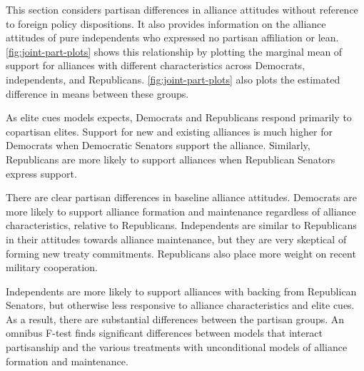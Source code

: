 \documentclass[12pt]{article}
\begin{document}
This section considers partisan differences in alliance attitudes without reference to foreign policy dispositions. 
It also provides information on the alliance attitudes of pure independents who expressed no partisan affiliation or lean. 
\autoref{fig:joint-part-plots} shows this relationship by plotting the marginal mean of support for alliances with different characteristics across Democrats, independents, and Republicans. 
\autoref{fig:joint-part-plots} also plots the estimated difference in means between these groups. 


As elite cues models expects, Democrats and Republicans respond primarily to copartisan elites.
Support for new and existing alliances is much higher for Democrats when Democratic Senators support the alliance.
Similarly, Republicans are more likely to support alliances when Republican Senators express support.


There are clear partisan differences in baseline alliance attitudes.
Democrats are more likely to support alliance formation and maintenance regardless of alliance characteristics, relative to Republicans. 
Independents are similar to Republicans in their attitudes towards alliance maintenance, but they are very skeptical of forming new treaty commitments. 
Republicans also place more weight on recent military cooperation. 


Independents are more likely to support alliances with backing from Republican Senators, but otherwise less responsive to alliance characteristics and elite cues. 
As a result, there are substantial differences between the partisan groups. 
An omnibus F-test finds significant differences between models that interact partisanship and the various treatments with unconditional models of alliance formation and maintenance. 
\end{document}
